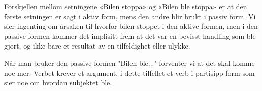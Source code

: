 \documentclass{myassignment}
\begin{document}
	Forskjellen mellom setningene «Bilen stoppa» og «Bilen ble stoppa» er at den første setningen er sagt i aktiv form, mens den andre blir brukt i passiv form. Vi sier ingenting om årsaken til hvorfor bilen stoppet i den aktive formen, men i den passive formen kommer det implisitt frem at det var en bevisst handling som ble gjort, og ikke bare et resultat av en tilfeldighet eller ulykke.

	Når man bruker den passive formen "Bilen ble..." forventer vi at det skal komme noe mer. Verbet krever et argument, i dette tilfellet et verb i partisipp-form som sier noe om hvordan subjektet ble.
\end{document}
